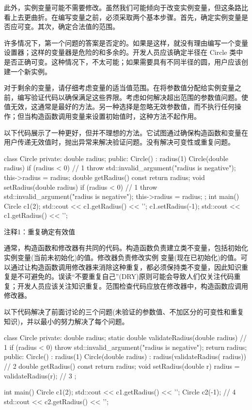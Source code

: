 此外，实例变量可能不需要修改。虽然我们可能倾向于改变实例变量，但这条路比看上去更曲折。在编写变量之前，必须采取两个基本步骤。首先，确定实例变量是否应可变。其次，确定合法值的范围。

许多情况下，第一个问题的答案是否定的。如果是这样，就没有理由编写一个变量设置器；这样的变量器是危险的和多余的。开发人员应该确定半径在 Circle 类中是否正确可变。这种情况下，不太可能；如果需要具有不同半径的圆，用户应该创建一个新实例。

对于剩余的变量，请仔细考虑变量的适当值范围。在将参数值分配给实例变量之前，编写验证代码以确保满足这些界限。考虑如何解决超出范围的参数值问题。使值无效，这通常是最好的方法。另一种选择是忽略无效参数值，而不执行任何操作；但当构造函数调用变量来设置初始值时，这种方法不起作用。


以下代码展示了一种更好，但并不理想的方法。它试图通过确保构造函数和变量在用户传递无效值时，抛出异常来解决验证问题。没有解决可变性或重复问题。


\begin{cpp}
class Circle {
private:
  double radius;
public:
  Circle() : radius(1) {}
  Circle(double radius) {
    if (radius < 0) // 1
      throw std::invalid_argument("radius is negative");
    this->radius = radius;
  }
  double getRadius() const { return radius; }
  void setRadius(double radius) {
    if (radius < 0) // 1
      throw std::invalid_argument("radius is negative");
    this->radius = radius;
  }
};
int main() {
  Circle c1(2);
  std::cout << c1.getRadius() << '\n';
  c1.setRadius(-1);
  std::cout << c1.getRadius() << '\n';
}
\end{cpp}

{\footnotesize
注释1：重复确定有效值
}

通常，构造函数和修改器有共同的代码。构造函数负责建立类不变量，包括初始化实例变量(当前未初始化)的值。修改器负责修改实例 变量(现在已初始化)的值。可以通过让构造函数调用修改器来消除这种重复，都必须保持类不变量，因此知识重复是不可避免的。误读“不要重复自己”(DRY)原则可能会导致人们仅关注代码重复；开发人员应该关注知识重复。范围检查代码应放在修改器中，构造函数应调用修改器。

以下代码解决了前面讨论的三个问题(未验证的参数值、不加区分的可变性和重复知识)，并以最小的努力解决了每个问题。


\begin{cpp}
class Circle {
private:
  double radius;
  static double validateRadius(double radius) { // 1
    if (radius < 0)
      throw std::invalid_argument("radius is negative");
    return radius;
  }
public:
  Circle() : radius(1) {}
  Circle(double radius) : radius(validateRadius(
    radius)) {} // 2
  double getRadius() const { return radius; }
  void setRadius(double r) { radius =
  validateRadius(r); } // 3
};

int main() {
  Circle c1(2);
  std::cout << c1.getRadius() << '\n';
  Circle c2(-1); // 4
  std::cout << c2.getRadius() << '\n';
}
\end{cpp}

